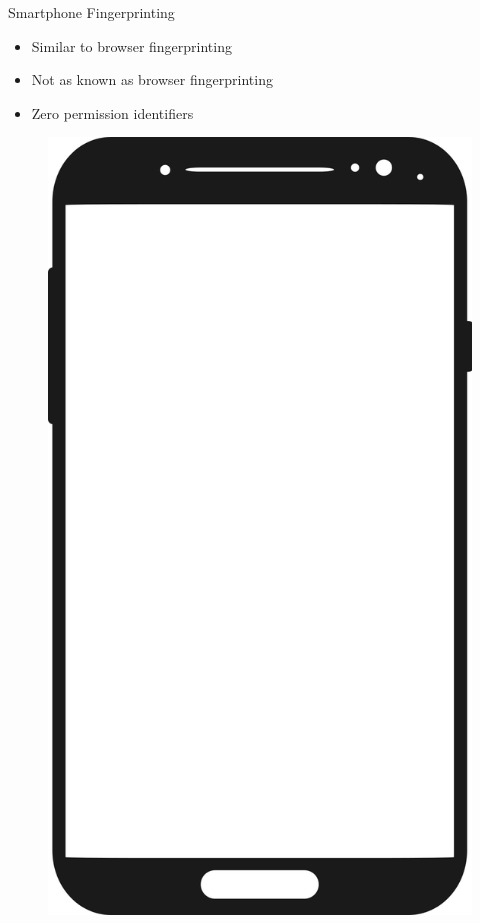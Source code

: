 \documentclass[aspectratio=169]{beamer}
\begin{document}
\begin{frame}{Smartphone Fingerprinting}
  \begin{minipage}{0.49\textwidth} 
    \begin{itemize}
      \item Similar to browser fingerprinting
      \pause
      \item Not as known as browser fingerprinting
      \pause
      \item Zero permission identifiers
    \end{itemize}
  \end{minipage}
  \hfill
  \begin{minipage}{0.49\textwidth} 
    \begin{figure}
      \centering
      \includegraphics[height=0.5\textheight]{figures/smartphone.png}
    \end{figure}
  \end{minipage}


\end{frame}
\end{document}
